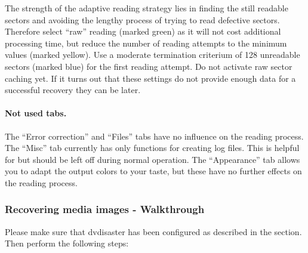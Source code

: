 The strength of the adaptive reading strategy lies in finding the
still readable sectors and avoiding the lengthy process of trying
to read defective sectors. Therefore select ``raw'' reading
(marked green) as it will not cost additional processing time,
but reduce the number of reading attempts to the minimum values
(marked yellow). Use a moderate termination criterium of 128 unreadable
sectors (marked blue) for the first reading attempt. Do not activate
raw sector caching yet. If it turns out that these settings do not
provide enough data for a successful recovery they can
be  later. 

\paragraph{Not used tabs.} The ``Error correction'' and ``Files'' tabs
have no influence on the reading process. The ``Misc'' tab currently
has only functions for creating log files. This is helpful for
 but should be left
off during normal operation. The ``Appearance'' tab allows you
to adapt the output colors to your taste, but these have no
further effects on the reading process. 

\newpage
\subsubsection{Recovering media images - Walkthrough}
\label{howto-recover-read}

Please make sure that dvdisaster has been configured as
described in the  section.
Then perform the following steps: 

\bigskip

